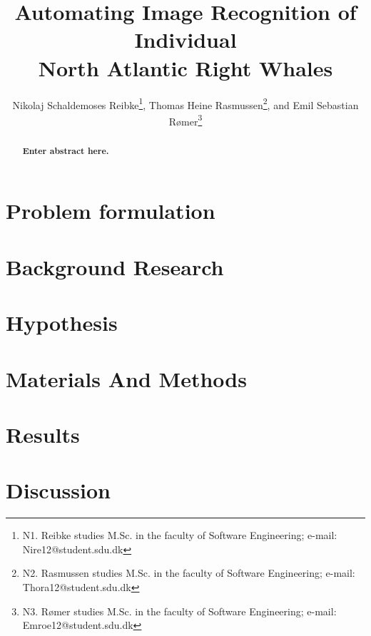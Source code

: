 \documentclass[10pt,a4paper,twocolumn]{article}
\begin{document}
\title{\textbf{Automating Image Recognition of Individual \\ North Atlantic Right Whales}}

\author{Nikolaj Schaldemoses Reibke\thanks{N1. Reibke studies M.Sc. in the faculty of Software Engineering; e-mail: Nire12@student.sdu.dk},
		Thomas Heine Rasmussen\thanks{N2. Rasmussen studies M.Sc. in the faculty of Software Engineering; e-mail: Thora12@student.sdu.dk},
        and Emil Sebastian R{\o}mer\thanks{N3. R{\o}mer studies M.Sc. in the faculty of Software Engineering; e-mail: Emroe12@student.sdu.dk}
}

\maketitle

\begin{abstract}
\textbf{Enter abstract here.}
\end{abstract}



\section{Problem formulation}


\section{Background Research}


\section{Hypothesis}


\section{Materials And Methods}


\section{Results}


\section{Discussion}

\end{document}
